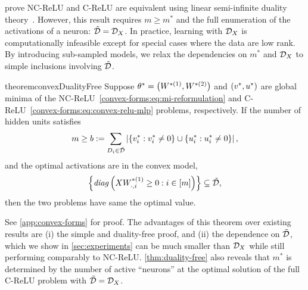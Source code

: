 \citet{pilanci2020convexnn} prove NC-ReLU and C-ReLU are equivalent using linear semi-infinite duality theory~\citep{ goberna2002semi}.
However, this result requires \( m \geq m^* \) and the full enumeration of the activations of a neuron: \( \tilde {\mathcal{D}} = \mathcal{D}_X \).
In practice, learning with \( \mathcal{D}_{X} \) is computationally infeasible except for special cases where the data are low rank.
By introducing sub-sampled models, we relax the dependencies on \( m^* \) and \( \mathcal{D}_X \) to simple inclusions involving \( \tilde {\mathcal{D}} \).





\begin{restatable}{theorem}{convexDualityFree}\label{thm:duality-free}
    Suppose \( \theta^* = \left(W^{*(1)}, W^{*(2)}\right) \) and \( \left(v^*, u^*\right) \)
    are global minima of the NC-ReLU~\eqref{convex-forms:eq:mi-reformulation}
    and C-ReLU~\eqref{convex-forms:eq:convex-relu-mlp} problems, respectively.
    If the number of hidden units satisfies
    \[ m \geq b := \sum_{D_i \in \tilde {\mathcal{D}}} \left\vert \left\{v^*_i : v^*_i \neq 0\right\} \cup \left\{u^*_i : u^*_i \neq 0\right\} \right\vert, \]
    and the optimal activations are in the convex model,
    \[ \left\{\text{\emph{diag}}\left(X W^{*(1)}_{\cdot, i} \geq 0 : i \in [m]\right) \right\} \subseteq \tilde {\mathcal{D}}, \]
    then the two problems have same the optimal value.
\end{restatable}
See \cref{app:convex-forms} for proof.
The advantages of this theorem over existing results are (i) the simple and duality-free proof, and (ii) the dependence on \( \tilde {\mathcal{D}} \), which we show in \cref{sec:experiments} can be much smaller than \( \mathcal{D}_X \) while still performing comparably to NC-ReLU.
\cref{thm:duality-free} also reveals that \( m^* \) is determined by the number of active ``neurons'' at the optimal solution of the full C-ReLU problem with \( \tilde {\mathcal{D}} = \mathcal{D}_X \).

